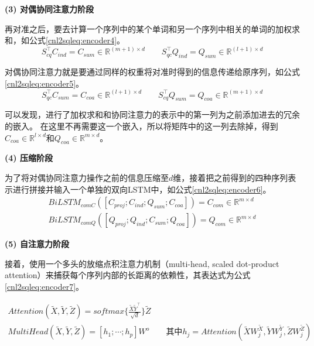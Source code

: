 \textbf{(3) 对偶协同注意力阶段}

再对准之后，要去计算一个序列中的某个单词和另一个序列中相关的单词的加权求和，如公式\ref{cnl2sqleq:encoder4}。
\begin{equation}
  \label{cnl2sqleq:encoder4}
  S_{cq}^{\top}C_{ind} = C_{sum} \in \mathbb{R}^{(m+1) \times d} \qquad S_{qc}^{\top}Q_{ind} = Q_{sum} \in \mathbb{R}^{(l+1) \times d}
\end{equation}

对偶协同注意力就是要通过同样的权重将对准时得到的信息传递给原序列，如公式\ref{cnl2sqleq:encoder5}。
\begin{equation}
  \label{cnl2sqleq:encoder5}
  S_{qc}^{\top}C_{sum} = C_{coa} \in \mathbb{R}^{(l+1) \times d} \qquad S_{cq}^{\top}Q_{sum} = Q_{coa} \in \mathbb{R}^{(m+1) \times d}
\end{equation}

可以发现，进行了加权求和和协同注意力的表示中的第一列为之前添加进去的冗余的嵌入。
在这里不再需要这一个嵌入，所以将矩阵中的这一列去除掉，得到$C_{coa} \in \mathbb{R}^{l \times d}$和$Q_{coa} \in \mathbb{R}^{m \times d}$。

\textbf{(4) 压缩阶段}

为了将对偶协同注意力操作之前的信息压缩至$d$维，接着把之前得到的四种序列表示进行拼接并输入一个单独的双向LSTM中，如公式\ref{cnl2sqleq:encoder6}。
\begin{align}
  \label{cnl2sqleq:encoder6}
  BiLSTM_{comC}([C_{proj};C_{ind};Q_{sum};C_{coa}]) =  C_{com} \in \mathbb{R}^{m \times d}\\
  BiLSTM_{comQ}([Q_{proj};Q_{ind};C_{sum};Q_{coa}]) =  Q_{com} \in \mathbb{R}^{m \times d}
\end{align}

\textbf{(5) 自注意力阶段}

接着，使用一个多头的放缩点积注意力机制（multi-head, scaled dot-product attention）\cite{vaswani2017attention}来捕获每个序列内部的长距离的依赖性，其表达式为公式\ref{cnl2sqleq:encoder7}。

\begin{gather}
  \label{cnl2sqleq:encoder7}
  Attention(\widetilde{X},\widetilde{Y},\widetilde{Z}) = softmax\{\frac{\widetilde{X}\widetilde{Y}^{\top}}{\sqrt{d}}\} \widetilde{Z}\\
  MultiHead(\widetilde{X},\widetilde{Y},\widetilde{Z}) = [h_1;\cdots;h_p]W^o \qquad \mbox{其中}h_j= Attention(\widetilde{X}W^{\widetilde{X}}_j,\widetilde{Y}W^{\widetilde{Y}}_j,\widetilde{Z}W^{\widetilde{Z}}_j)
\end{gather}

